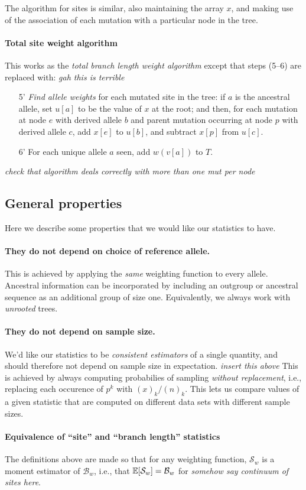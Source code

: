 \documentclass{article}
\newcommand{\branch}{\mathcal{B}} %
\newcommand{\site}{\mathcal{S}} %
\newcommand{\plr}[1]{{\color{blue} \it #1}}
\begin{document}
The algorithm for sites is similar, also maintaining the array $x$,
and making use of the association of each mutation with a particular node in the tree.

\paragraph{Total site weight algorithm}
This works as the \emph{total branch length weight algorithm} except that steps (5--6) are replaced with:
\plr{gah this is terrible}
\begin{itemize}
    \item[5'] \emph{Find allele weights} for each mutated site in the tree:
        if $a$ is the ancestral allele,
        set $u[a]$ to be the value of $x$ at the root; and then,
        for each mutation at node $e$ with derived allele $b$ 
        and parent mutation occurring at node $p$ with derived allele $c$,
        add $x[e]$ to $u[b]$, and subtract $x[p]$ from $u[c]$.
    \item[6'] For each unique allele $a$ seen,
        add $w(v[a])$ to $T$.
\end{itemize}
\plr{check that algorithm deals correctly with more than one mut per node}

\subsection*{General properties}

Here we describe some properties that we would like our statistics to have.

\paragraph{They do not depend on choice of reference allele.}
This is achieved by applying the \emph{same} weighting function to every allele.
Ancestral information can be incorporated by including an outgroup or ancestral sequence
as an additional group of size one.
Equivalently, we always work with \emph{unrooted} trees.

\paragraph{They do not depend on sample size.}
We'd like our statistics to be \emph{consistent estimators}
of a single quantity, and should therefore not depend on sample size in expectation.
\plr{insert this above}
This is achieved by always computing probabilies of sampling \emph{without replacement},
i.e., replacing each occurence of $p^k$ with $(x)_k/(n)_k$.
This lets us compare values of a given statistic
that are computed on different data sets with different sample sizes.

\paragraph{Equivalence of ``site'' and ``branch length'' statistics}
The definitions above are made so that for any weighting function,
$\site_w$ is a moment estimator of $\branch_w$, i.e.,
that $\E[\site_w] = \branch_w$ for \plr{somehow say continuum of sites here}.
\end{document}
